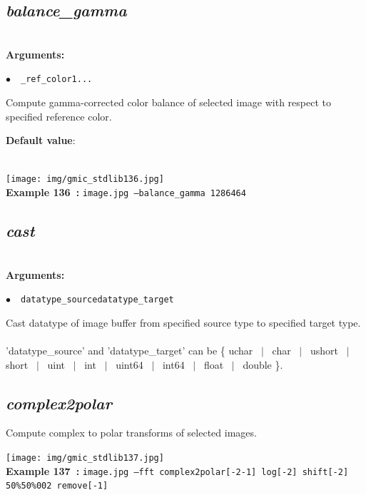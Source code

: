 \documentclass[a4paper,10.5pt,twoside]{book}
\def\comma{\discretionary{,}{}{,}}
\newcommand{\Cb}[1]{\textcolor{cb}{#1}}
\newcommand{\Cc}[1]{\textcolor{cc}{#1}}
\begin{document}
\subsection{\emph{balance\_gamma} }\vspace*{-0.7em}
~\\\textbf{\Cb{Arguments: }}\begin{flushleft}
{\small \Cb{\hspace*{0.5cm}$\bullet$~~\texttt{\_ref\_color1{\comma}...}}}\end{flushleft}
Compute gamma-corrected color balance of selected image{\comma} with respect to specified reference color.
\begin{flushleft}\Cc{\textbf{Default value}:\\~\\\hspace*{0.5cm}{\small $\bullet$~~\texttt{'ref\_color1=128'.}}}\end{flushleft}
\begin{center}\texttt{[image: img/gmic\_stdlib136.jpg]}\\
{\footnotesize \textbf{Example 136~:} \texttt{image.jpg --balance\_gamma 128{\comma}64{\comma}64}}
\end{center}

\subsection{\emph{cast} }\vspace*{-0.7em}
~\\\textbf{\Cb{Arguments: }}\begin{flushleft}
{\small \Cb{\hspace*{0.5cm}$\bullet$~~\texttt{datatype\_source{\comma}datatype\_target}}}\end{flushleft}
Cast datatype of image buffer from specified source type to specified target type.
~\\'datatype\_source' and 'datatype\_target' can be \{ uchar ~$|$~ char ~$|$~ ushort ~$|$~ short ~$|$~ uint ~$|$~ int ~$|$~ uint64 ~$|$~ int64 ~$|$~ float ~$|$~ double \}.


\subsection{\emph{complex2polar} }\vspace*{-0.7em}
Compute complex to polar transforms of selected images.
\begin{center}\texttt{[image: img/gmic\_stdlib137.jpg]}\\
{\footnotesize \textbf{Example 137~:} \texttt{image.jpg --fft complex2polar[-2{\comma}-1] log[-2] shift[-2] 50\%{\comma}50\%{\comma}0{\comma}0{\comma}2 remove[-1]}}
\end{center}
\end{document}
